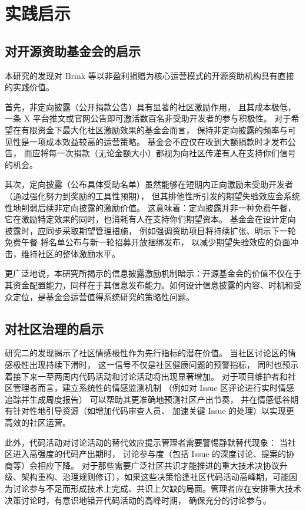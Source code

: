 \documentclass[
    type = master, %
    degree = professional,        %
    decl-page,  %
    twoside,                %
    fontset = fandol %
  ]{njuthesis}
\begin{document}
\section{实践启示}

\subsection{对开源资助基金会的启示}

本研究的发现对 Brink 等以非盈利捐赠为核心运营模式的开源资助机构具有直接的实践价值。

首先，非定向披露（公开捐款公告）具有显著的社区激励作用，
且其成本极低，一条 X 平台推文或官网公告即可激活数百名非受助开发者的参与积极性。
对于希望在有限资金下最大化社区激励效果的基金会而言，
保持非定向披露的频率与可见性是一项成本效益较高的运营策略。
基金会不应仅在收到大额捐款时才发布公告，
而应将每一次捐款（无论金额大小）都视为向社区传递有人在支持你们信号的机会。

其次，定向披露（公布具体受助名单）虽然能够在短期内正向激励未受助开发者
（通过强化努力到奖励的工具性预期），
但其排他性所引发的期望失验效应会系统性地削弱后续非定向披露的激励价值。
这意味着：定向披露并非一种免费午餐，
它在激励特定效果的同时，也消耗有人在支持你们期望资本。
基金会在设计定向披露时，应同步采取期望管理措施，
例如强调资助项目将持续扩张、明示下一轮免费午餐
将名单公布与新一轮招募开放捆绑发布，
以减少期望失验效应的负面冲击，维持社区的整体激励水平。

更广泛地说，本研究所揭示的信息披露激励机制暗示：开源基金会的价值不仅在于其资金配置能力，同样在于其信息发布能力。如何设计信息披露的内容、时机和受众定位，是基金会运营值得系统研究的策略性问题。

\subsection{对社区治理的启示}

研究二的发现揭示了社区情感极性作为先行指标的潜在价值。
当社区讨论区的情感极性出现持续下滑时，
这一信号不仅是社区健康问题的预警指标，
同时也预示着接下来一至两周内代码活动和讨论活动将出现显著增加。
对于项目维护者和社区管理者而言，建立系统性的情感监测机制
（例如对 Issue 区评论进行实时情感追踪并生成周度报告）
可以帮助其更准确地预测社区产出节奏，
并在情感低谷期有针对性地引导资源（如增加代码审查人员、
加速关键 Issue 的处理）以实现更高效的社区运营。

此外，代码活动对讨论活动的替代效应提示管理者需要警惕静默替代现象：
当社区进入高强度的代码产出期时，
讨论参与度（包括 Issue 的深度讨论、提案的协商等）会相应下降。
对于那些需要广泛社区共识才能推进的重大技术决协议升级、架构重构、治理规则修订），如果这些决策恰逢社区代码活动高峰期，可能因为讨论参与不足而形成技术上完成、共识上欠缺的局面。管理者应在安排重大技术决策讨论时，有意识地错开代码活动的高峰时期，
确保充分的讨论参与。
\end{document}
